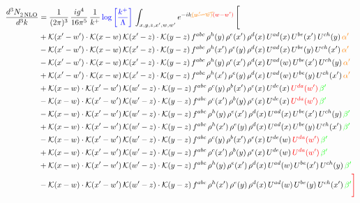 \documentclass[9pt]{article}
\numberwithin{equation}{section}
\begin{document}
\begin{align}
  \frac{d^{3}N_{2\,\rm NLO}^{\rm}}{d^{3}k}  & = \frac{1}{(2\pi)^{3}}\, \frac{ig^{4}}{16\pi^{5}}\, \frac{1}{k^{+}}\, {\color{blue}\log{\left[\frac{k^{+}}{\Lambda}\right]}}\, \int_{x,y,z,x^{\prime},w,w^{\prime}}e^{-ik{\color{orange}\cancel{(w^{\prime}-w)}}{\color{red}(w-w^{\prime})}}\, \Bigg[\notag \\ &   +\mathcal{K}(x'-w')\cdot\mathcal{K}(x-w)\,\mathcal{K}(x'-z)\cdot\mathcal{K}(y-z)\, f^{abc}\,\rho^{h}(y)\,\rho^{e}(x')\,\rho^{d}(x)\,U^{ad}(x)\,U^{be}(x')\,U^{ch}(y)\,{\color{orange}\alpha'}\notag\\ &-\mathcal{K}(x'-w')\cdot\mathcal{K}(x-w)\,\mathcal{K}(x'-z)\cdot\mathcal{K}(y-z)\, f^{abc}\,\rho^{h}(x')\,\rho^{e}(y)\,\rho^{d}(x)\,U^{ad}(x)\,U^{be}(y)\,U^{ch}(x')\,{\color{orange}\alpha'}\notag\\ &-\mathcal{K}(x'-w')\cdot\mathcal{K}(x-w)\,\mathcal{K}(x'-z)\cdot\mathcal{K}(y-z)\, f^{abc}\,\rho^{h}(y)\,\rho^{e}(x')\,\rho^{d}(x)\,U^{ad}(w)\,U^{be}(x')\,U^{ch}(y)\,{\color{orange}\alpha'}\notag \\ &+\mathcal{K}(x'-w')\cdot\mathcal{K}(x-w)\,\mathcal{K}(x'-z)\cdot\mathcal{K}(y-z)\, f^{abc}\,\rho^{h}(x')\,\rho^{e}(y)\,\rho^{d}(x)\,U^{ad}(w)\,U^{be}(y)\,U^{ch}(x')\,{\color{orange}\alpha'}\notag \\ & +\mathcal{K}(x-w)\cdot\mathcal{K}(x'-w')\,\mathcal{K}(w'-z)\cdot\mathcal{K}(y-z)\, f^{abc}\,\rho^{c}(y)\,\rho^{b}(x')\,\rho^{e}(x)\,U^{de}(x)\,{\color{red}U^{da}(w')}\,{\color{green}\beta'}\notag \\ &-\mathcal{K}(x-w)\cdot\mathcal{K}(x'-w')\,\mathcal{K}(w'-z)\cdot\mathcal{K}(y-z)\, f^{abc}\,\rho^{c}(x')\,\rho^{b}(y)\,\rho^{e}(x)\,U^{de}(x)\,{\color{red}U^{da}(w')}\,{\color{green}\beta'}\notag \\ & -\mathcal{K}(x-w)\cdot\mathcal{K}(x'-w')\,\mathcal{K}(w'-z)\cdot\mathcal{K}(y-z)\, f^{abc}\,\rho^{h}(y)\,\rho^{e}(x')\,\rho^{d}(x)\,U^{ad}(x)\,U^{be}(x')\,U^{ch}(y)\,{\color{green}\beta'}\notag\\ &+\mathcal{K}(x-w)\cdot\mathcal{K}(x'-w')\,\mathcal{K}(w'-z)\cdot\mathcal{K}(y-z)\, f^{abc}\,\rho^{h}(x')\,\rho^{e}(y)\,\rho^{d}(x)\,U^{ad}(x)\,U^{be}(y)\,U^{ch}(x')\,{\color{green}\beta'}\notag\\ &-\mathcal{K}(x-w)\cdot\mathcal{K}(x'-w')\,\mathcal{K}(w'-z)\cdot\mathcal{K}(y-z)\, f^{abc}\,\rho^{c}(y)\,\rho^{b}(x')\,\rho^{e}(x)\,U^{de}(w)\,{\color{red}U^{da}(w')}\,{\color{green}\beta'}\notag\\ &+\mathcal{K}(x-w)\cdot\mathcal{K}(x'-w')\,\mathcal{K}(w'-z)\cdot\mathcal{K}(y-z)\, f^{abc}\,\rho^{c}(x')\,\rho^{b}(y)\,\rho^{e}(x)\,U^{de}(w)\,{\color{red}U^{da}(w')}\,{\color{green}\beta'}\notag\\ &+\mathcal{K}(x-w)\cdot\mathcal{K}(x'-w')\,\mathcal{K}(w'-z)\cdot\mathcal{K}(y-z)\, f^{abc}\,\rho^{h}(y)\,\rho^{e}(x')\,\rho^{d}(x)\,U^{ad}(w)\,U^{be}(x')\,U^{ch}(y)\,{\color{green}\beta'}\notag \\ &-\mathcal{K}(x-w)\cdot\mathcal{K}(x'-w')\,\mathcal{K}(w'-z)\cdot\mathcal{K}(y-z)\, f^{abc}\,\rho^{h}(x')\,\rho^{e}(y)\,\rho^{d}(x)\,U^{ad}(w)\,U^{be}(y)\,U^{ch}(x')\,{\color{green}\beta'}{\color{red}\Bigg]}
\end{align}  
\end{document}
